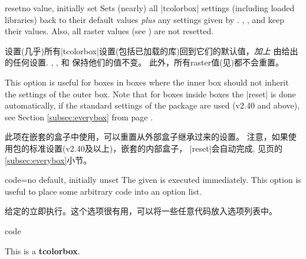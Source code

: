 \begin{docTcbKey}{reset}{}{no value, initially set}
Sets (nearly) all |tcolorbox| settings (including loaded libraries) back to their default values
\emph{plus} any settings given by .
, , and
 keep their values.
Also, all raster values (see ) are not resetted.

设置(几乎)所有|tcolorbox|设置(包括已加载的库)回到它们的默认值，\emph{加上} 由给出的任何设置.%
, , 和  保持他们的值不变。%
此外，所有raster值(见)都不会重置。

This option is useful for boxes in boxes where the inner box should not inherit
the settings of the outer box.
Note that for boxes inside boxes the |reset| is done automatically, if the
standard settings of the package are used (v2.40 and above), see
Section \ref{subsec:everybox} from page \pageref{subsec:everybox}.

此项在嵌套的盒子中使用，可以重置从外部盒子继承过来的设置。%
注意，如果使用包的标准设置(v2.40及以上)，嵌套的内部盒子， |reset|会自动完成, 见\pageref{subsec:everybox}页的\ref{subsec:everybox}小节。
\end{docTcbKey}




\begin{docTcbKey}{code}{=}{no default, initially unset}
The given  is executed immediately. This option is useful
to place some arbitrary code into an option list.

给定的立即执行。这个选项很有用，可以将一些任意代码放入选项列表中。
\begin{exdispExample}{code}

\begin{tcolorbox}[code={\newcommand{\mycommand}{\textit{working}}},
title=My \mycommand\ title]
This is a \textbf{tcolorbox}.
\end{tcolorbox}
\end{exdispExample}
\end{docTcbKey}



